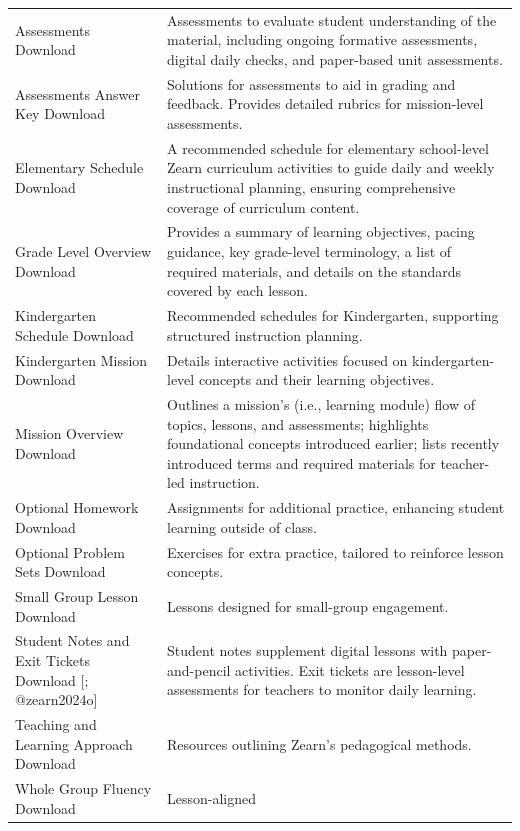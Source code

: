 \documentclass[
  number,
  preprint,
  3p,
  onecolumn]{elsarticle}
\begin{document}
\begin{longtable}[]{@{}
  >{\raggedright\arraybackslash}p{}
  >{\raggedright\arraybackslash}p{}@{}}
Assessments Download \citep{zearn2024e} & Assessments to evaluate
student understanding of the material, including ongoing formative
assessments, digital daily checks, and paper-based unit assessments. \\
Assessments Answer Key Download \citep{zearn2024f} & Solutions for
assessments to aid in grading and feedback. Provides detailed rubrics
for mission-level assessments. \\
Elementary Schedule Download \citep{zearn2024g} & A recommended schedule
for elementary school-level Zearn curriculum activities to guide daily
and weekly instructional planning, ensuring comprehensive coverage of
curriculum content. \\
Grade Level Overview Download \citep{zearn2024h} & Provides a summary of
learning objectives, pacing guidance, key grade-level terminology, a
list of required materials, and details on the standards covered by each
lesson. \\
Kindergarten Schedule Download \citep{zearn2024i} & Recommended
schedules for Kindergarten, supporting structured instruction
planning. \\
Kindergarten Mission Download \citep{zearn2024j} & Details interactive
activities focused on kindergarten-level concepts and their learning
objectives. \\
Mission Overview Download \citep{zearn2024h} & Outlines a mission's
(i.e., learning module) flow of topics, lessons, and assessments;
highlights foundational concepts introduced earlier; lists recently
introduced terms and required materials for teacher-led instruction. \\
Optional Homework Download \citep{zearn2024k} & Assignments for
additional practice, enhancing student learning outside of class. \\
Optional Problem Sets Download \citep{zearn2024l} & Exercises for extra
practice, tailored to reinforce lesson concepts. \\
Small Group Lesson Download \citep{zearn2024m} & Lessons designed for
small-group engagement. \\
Student Notes and Exit Tickets Download {[}\citep{zearn2024n};
@zearn2024o{]} & Student notes supplement digital lessons with
paper-and-pencil activities. Exit tickets are lesson-level assessments
for teachers to monitor daily learning. \\
Teaching and Learning Approach Download \citep{zearn2024p} & Resources
outlining Zearn's pedagogical methods. \\
Whole Group Fluency Download \citep{zearn2024q} & Lesson-aligned

\end{longtable}
\end{document}
